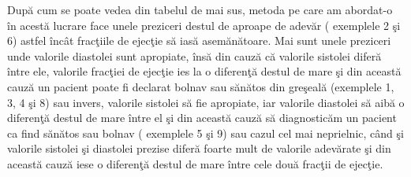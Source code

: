 Dup\u{a} cum se poate vedea din tabelul de mai sus, metoda pe care am abordat-o \^{i}n acest\u{a} lucrare face unele preziceri destul de aproape de adev\u{a}r ( exemplele 2 \c{s}i 6)  astfel \^{i}nc\^{a}t frac\c{t}iile de ejec\c{t}ie s\u{a} ias\u{a} asem\u{a}n\u{a}toare. Mai sunt unele preziceri unde valorile diastolei sunt apropiate, \^{i}ns\u{a} din cauz\u{a} c\u{a} valorile sistolei difer\u{a} \^{i}ntre ele, valorile frac\c{t}iei de ejec\c{t}ie ies la o diferen\c{t}\u{a} destul de mare \c{s}i din aceast\u{a} cauz\u{a} un pacient poate fi declarat bolnav sau s\u{a}n\u{a}tos din gre\c{s}eal\u{a} (exemplele 1, 3, 4 \c{s}i 8) sau invers, valorile sistolei s\u{a} fie apropiate, iar valorile diastolei s\u{a} aib\u{a} o diferen\c{t}\u{a} destul de mare \^{i}ntre el \c{s}i din aceast\u{a} cauz\u{a} s\u{a} diagnostic\u{a}m un pacient ca find s\u{a}n\u{a}tos sau bolnav ( exemplele 5 \c{s}i 9) sau cazul cel mai neprielnic, c\^{a}nd \c{s}i valorile sistolei \c{s}i diastolei prezise difer\u{a} foarte mult de valorile adev\u{a}rate \c{s}i din aceast\u{a} cauz\u{a} iese o diferen\c{t}\u{a} destul de mare \^{i}ntre cele dou\u{a} frac\c{t}ii de ejec\c{t}ie.